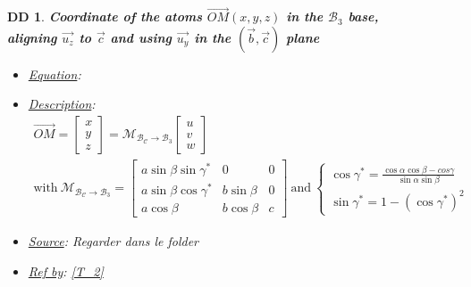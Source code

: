 \documentclass[12pt]{article}
\newtheorem{DD}{DD}
\begin{document}
\begin{DD}
\label{DD_1}
\noindent\colorbox{shadecolorDD}{\normalfont \textbf{Coordinate of the atoms $ \overrightarrow{OM}(x,y,z)$ in the $\mathcal{B}_3$ base, \\ aligning $\vec{u_z}$ to $\vec{c}$ and using $\vec{u_y}$ in the $(\vec{b}, \vec{c})$ plane}}
\normalfont
\begin{itemize}
\item \underline{Equation}:  
\item \underline{Description}: 
\begin{equation}
\begin{gathered}
\overrightarrow{OM} = 
\begin{bmatrix}
 x \\
y \\
z 
\end{bmatrix} =  \mathcal{M_{\mathcal{B}_C\rightarrow \mathcal{B}_3}} 
\begin{bmatrix}
u \\
v \\
w 
\end{bmatrix} \\ 
\text{with} \ \mathcal{M_{\mathcal{B}_C\rightarrow \mathcal{B}_3}}  = 
\begin{bmatrix}
a\sin{\beta}\sin{\gamma^{*}} & 0 & 0 \\
a\sin{\beta}\cos{\gamma^{*}} & b\sin{\beta} & 0 \\
a\cos{\beta} & b\cos{\beta} & c
\end{bmatrix} \ \text{and} \ 
\begin{cases}
\cos{\gamma^{*}} =  \frac{\cos{\alpha}\cos{\beta} - cos{\gamma}}{\sin{\alpha}\sin{\beta}} \\
\sin{\gamma^{*}} = 1 - (\cos{\gamma^{*}})^{2}
\end{cases}
\end{gathered}
\label{eq:change_base_crystal_base_unif}
\end{equation}
\item \underline{Source}: Regarder dans le folder
\item \underline{Ref by}: \cref{T_2}
\end{itemize}
\end{DD}
\end{document}
